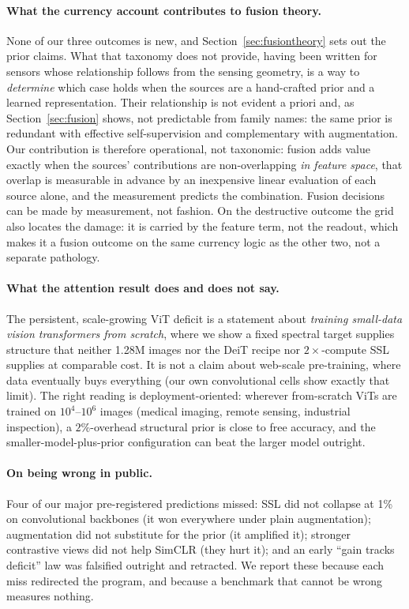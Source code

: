 \paragraph{What the currency account contributes to fusion theory.}
 None of our three outcomes is new, and Section~\ref{sec:fusiontheory} sets out
the prior claims. What that taxonomy does not provide, having been written for
sensors whose relationship follows from the sensing geometry, is a way to
\emph{determine} which case holds when the sources are a hand-crafted prior
and a learned representation. Their relationship is not evident a priori and,
as Section~\ref{sec:fusion} shows, not predictable from family names: the same
prior is redundant with effective self-supervision and complementary with
augmentation. Our contribution is therefore operational, not taxonomic: fusion adds value exactly when the sources' contributions are
non-overlapping \emph{in feature space}, that overlap is measurable in advance
by an inexpensive linear evaluation of each source alone, and the measurement
predicts the combination. Fusion decisions can be made by measurement, not fashion. On the destructive outcome the grid also locates the damage:
it is carried by the feature term, not the readout, which makes it a
fusion outcome on the same currency logic as the other two, not a separate pathology.

\paragraph{What the attention result does and does not say.}
The persistent, scale-growing ViT deficit is a statement about
\emph{training small-data vision transformers from scratch}, where we
show a fixed spectral target supplies structure that neither 1.28M images
nor the DeiT recipe nor $2\times$-compute SSL supplies at comparable cost. It is
not a claim about web-scale pre-training, where data eventually buys
everything (our own convolutional cells show exactly that limit). The
right reading is deployment-oriented: wherever from-scratch ViTs are
trained on $10^4$--$10^6$ images (medical imaging, remote sensing,
industrial inspection), a $2\%$-overhead structural prior is close to
free accuracy, and the smaller-model-plus-prior configuration can beat
the larger model outright.

\paragraph{On being wrong in public.}
Four of our major pre-registered predictions missed: SSL did not collapse
at 1\% on convolutional backbones (it won everywhere under plain
augmentation); augmentation did not substitute for the prior (it
amplified it); stronger contrastive views did not help SimCLR (they hurt
it); and an early ``gain tracks deficit'' law was falsified outright and
retracted. We report these because each miss redirected the program, and because a benchmark that cannot be wrong measures nothing.

